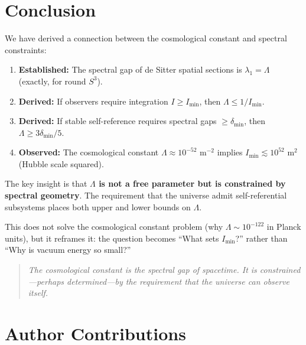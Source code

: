 \documentclass[11pt,a4paper]{article}
\theoremstyle{plain}
\theoremstyle{definition}
\theoremstyle{remark}
\begin{document}
\section{Conclusion}

We have derived a connection between the cosmological constant and spectral constraints:

\begin{enumerate}
    \item \textbf{Established:} The spectral gap of de Sitter spatial sections is $\lambda_1 = \Lambda$ (exactly, for round $S^3$).

    \item \textbf{Derived:} If observers require integration $I \geq I_{\min}$, then $\Lambda \leq 1/I_{\min}$.

    \item \textbf{Derived:} If stable self-reference requires spectral gaps $\geq \delta_{\min}$, then $\Lambda \geq 3\delta_{\min}/5$.

    \item \textbf{Observed:} The cosmological constant $\Lambda \approx 10^{-52}$ m$^{-2}$ implies $I_{\min} \lesssim 10^{52}$ m$^2$ (Hubble scale squared).
\end{enumerate}

The key insight is that \textbf{$\Lambda$ is not a free parameter but is constrained by spectral geometry}. The requirement that the universe admit self-referential subsystems places both upper and lower bounds on $\Lambda$.

This does not solve the cosmological constant problem (why $\Lambda \sim 10^{-122}$ in Planck units), but it reframes it: the question becomes ``What sets $I_{\min}$?'' rather than ``Why is vacuum energy so small?''

\medskip

\begin{quote}
\emph{The cosmological constant is the spectral gap of spacetime. It is constrained---perhaps determined---by the requirement that the universe can observe itself.}
\end{quote}


\section*{Author Contributions}
\end{document}
